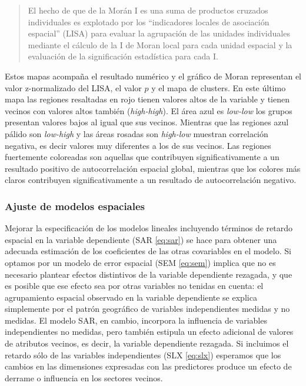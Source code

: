 \documentclass[12pt,]{book}
\begin{document}
\begin{quote}
El hecho de que de la Morán I es una suma de productos cruzados
individuales es explotado por los ``indicadores locales de asociación
espacial'' (LISA) para evaluar la agrupación de las unidades
individuales mediante el cálculo de la I de Moran local para cada unidad
espacial y la evaluación de la significación estadística para cada I.
\citep{wikilisa}
\end{quote}

Estos mapas acompaña el resultado numérico y el gráfico de Moran
representan el valor z-normalizado del LISA, el valor \(p\) y el mapa de
clusters. En este último mapa las regiones resaltadas en rojo tienen
valores altos de la variable y tienen vecinos con valores altos también
(\emph{high-high}). El área azul es \emph{low-low} los grupos presentan
valores bajos al igual que sus vecinos. Mientras que las regiones azul
pálido son \emph{low-high} y las áreas rosadas son \emph{high-low}
muestran correlación negativa, es decir valores muy diferentes a los de
sus vecinos. Las regiones fuertemente coloreadas son aquellas que
contribuyen significativamente a un resultado positivo de
autocorrelación espacial global, mientras que los colores más claros
contribuyen significativamente a un resultado de autocorrelación
negativo.

\subsubsection{Ajuste de modelos
espaciales}\label{ajuste-de-modelos-espaciales}

Mejorar la especificación de los modelos lineales incluyendo términos de
retardo espacial en la variable dependiente (SAR \eqref{eq:sar}) se hace
para obtener una adecuada estimación de los coeficientes de las otras
covariables en el modelo. Si optamos por un modelo de error espacial
(SEM \eqref{eq:sem}) implica que no es necesario plantear efectos
distintivos de la variable dependiente rezagada, y que es posible que
ese efecto sea por otras variables no tenidas en cuenta: el agrupamiento
espacial observado en la variable dependiente se explica simplemente por
el patrón geográfico de variables independientes medidas y no medidas.
El modelo SAR, en cambio, incorpora la influencia de variables
independientes no medidas, pero también estipula un efecto adicional de
valores de atributos vecinos, es decir, la variable dependiente
rezagada. Si incluimos el retardo sólo de las variables independientes
(SLX \eqref{eq:slx}) esperamos que los cambios en las dimensiones
expresadas con las predictores produce un efecto de derrame o influencia
en los sectores vecinos.
\end{document}
